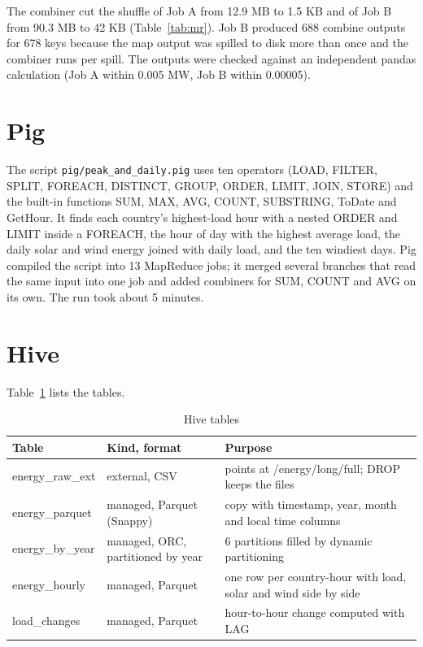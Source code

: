 \documentclass[12pt,a4paper]{report}
\begin{document}
The combiner cut the shuffle of Job A from 12.9 MB to 1.5 KB and of Job B from 90.3 MB to 42 KB (Table~\ref{tab:mr}). Job B produced 688 combine outputs for 678 keys because the map output was spilled to disk more than once and the combiner runs per spill. The outputs were checked against an independent pandas calculation (Job A within 0.005 MW, Job B within 0.00005).

\section{Pig}\label{sec:pig}
The script \texttt{pig/peak\_and\_daily.pig} uses ten operators (LOAD, FILTER, SPLIT, FOREACH, DISTINCT, GROUP, ORDER, LIMIT, JOIN, STORE) and the built-in functions SUM, MAX, AVG, COUNT, SUBSTRING, ToDate and GetHour. It finds each country's highest-load hour with a nested ORDER and LIMIT inside a FOREACH, the hour of day with the highest average load, the daily solar and wind energy joined with daily load, and the ten windiest days. Pig compiled the script into 13 MapReduce jobs; it merged several branches that read the same input into one job and added combiners for SUM, COUNT and AVG on its own. The run took about 5 minutes.

\section{Hive}\label{sec:hive}
Table~\ref{tab:hive} lists the tables.
\begin{table}[H]
\centering\small
\caption{Hive tables}\label{tab:hive}
\begin{tabularx}{\textwidth}{llX}
\toprule
Table & Kind, format & Purpose\\
\midrule
energy\_raw\_ext & external, CSV & points at /energy/long/full; DROP keeps the files\\
energy\_parquet & managed, Parquet (Snappy) & copy with timestamp, year, month and local time columns\\
energy\_by\_year & managed, ORC, partitioned by year & 6 partitions filled by dynamic partitioning\\
energy\_hourly & managed, Parquet & one row per country-hour with load, solar and wind side by side\\
load\_changes & managed, Parquet & hour-to-hour change computed with LAG\\
\bottomrule
\end{tabularx}
\end{table}
\end{document}
